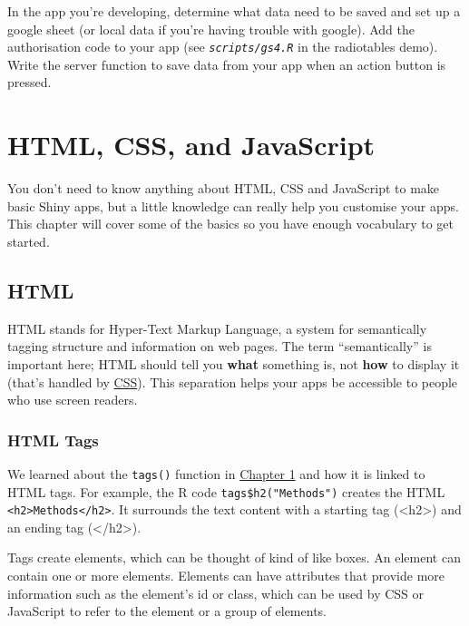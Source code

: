 \documentclass[
  oneside]{book}
\newcommand{\NormalTok}[1]{#1}
\begin{document}
In the app you're developing, determine what data need to be saved and set up a google sheet (or local data if you're having trouble with google). Add the authorisation code to your app (see \textit{\texttt{scripts/gs4.R}} in the radiotables demo). Write the server function to save data from your app when an action button is pressed.

\hypertarget{web}{%
\chapter{HTML, CSS, and JavaScript}\label{web}}

You don't need to know anything about HTML, CSS and JavaScript to make basic Shiny apps, but a little knowledge can really help you customise your apps. This chapter will cover some of the basics so you have enough vocabulary to get started.

\hypertarget{html}{%
\section{HTML}\label{html}}

HTML stands for Hyper-Text Markup Language, a system for semantically tagging structure and information on web pages. The term ``semantically'' is important here; HTML should tell you \textbf{what} something is, not \textbf{how} to display it (that's handled by \protect\hyperlink{CSS}{CSS}). This separation helps your apps be accessible to people who use screen readers.

\hypertarget{html-tags}{%
\subsection{HTML Tags}\label{html-tags}}

We learned about the \texttt{tags}\texttt{()} function in \protect\hyperlink{tags}{Chapter 1} and how it is linked to HTML tags. For example, the R code \texttt{tags\$h2("Methods")} creates the HTML \texttt{\textless{}h2\textgreater{}Methods\textless{}/h2\textgreater{}}. It surrounds the text content with a starting tag (\NormalTok{<h2>}) and an ending tag (\NormalTok{</h2>}).

Tags create elements, which can be thought of kind of like boxes. An element can contain one or more elements. Elements can have attributes that provide more information such as the element's \NormalTok{id} or \NormalTok{class}, which can be used by CSS or JavaScript to refer to the element or a group of elements.
\end{document}
